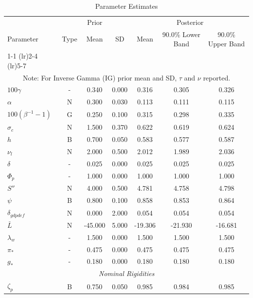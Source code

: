 \documentclass[12pt]{article}
\begin{document}
\pagestyle{empty}
\vspace*{.5cm}
{\small
\begin{longtable}{lcccccc}
\caption{Parameter Estimates}
\\ \hline
\multicolumn{1}{c}{} & \multicolumn{3}{c}{Prior} & \multicolumn{3}{c}{Posterior} \\
Parameter & Type & Mean & SD & Mean & 90.0\% {\tiny Lower Band} & 90.0\% {\tiny Upper Band} \\
\cmidrule(lr){1-1} \cmidrule(lr){2-4} \cmidrule(lr){5-7}
\endhead
\hline
\\ \multicolumn{7}{c}{\footnotesize Note: For Inverse Gamma (IG) prior mean and SD, $\tau$ and $\nu$ reported.}
\endfoot
\multicolumn{7}{c}{\textit{Steady State}} \\[3pt]
$100\gamma$ & - &    0.340 &    0.000 &    0.316 &    0.305 &    0.326 \\
$\alpha$ & N &    0.300 &    0.030 &    0.113 &    0.111 &    0.115 \\
$100(\beta^{-1} - 1)$ & G &    0.250 &    0.100 &    0.315 &    0.298 &    0.335 \\
$\sigma_{c}$ & N &    1.500 &    0.370 &    0.622 &    0.619 &    0.624 \\
$   h$ & B &    0.700 &    0.050 &    0.583 &    0.577 &    0.587 \\
$\nu_l$ & N &    2.000 &    0.500 &    2.012 &    1.989 &    2.036 \\
$\delta$ & - &    0.025 &    0.000 &    0.025 &    0.025 &    0.025 \\
$\Phi_p$ & - &    1.000 &    0.000 &    1.000 &    1.000 &    1.000 \\
$ S''$ & N &    4.000 &    0.500 &    4.781 &    4.758 &    4.798 \\
$\psi$ & B &    0.800 &    0.100 &    0.858 &    0.853 &    0.864 \\
$\delta_{gdpdef}$ & N &    0.000 &    2.000 &    0.054 &    0.054 &    0.054 \\
$\bar{L}$ & N &  -45.000 &    5.000 &  -19.306 &  -21.930 &  -16.681 \\
$\lambda_w$ & - &    1.500 &    0.000 &    1.500 &    1.500 &    1.500 \\
$\pi_*$ & - &    0.475 &    0.000 &    0.475 &    0.475 &    0.475 \\
$ g_*$ & - &    0.180 &    0.000 &    0.180 &    0.180 &    0.180 \\
\multicolumn{7}{c}{\textit{Nominal Rigidities}} \\[3pt]
$\zeta_p$ & B &    0.750 &    0.050 &    0.985 &    0.984 &    0.985 \\

\end{longtable}}
\end{document}
